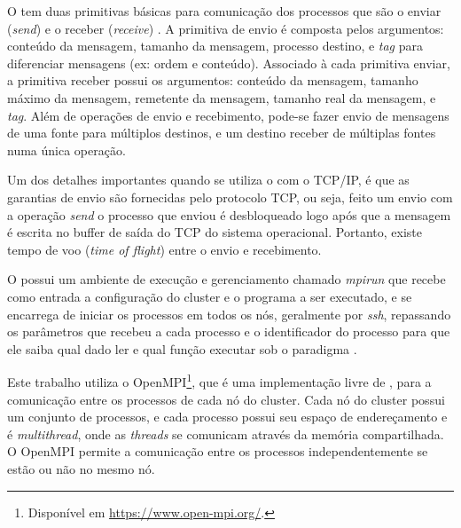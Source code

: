 O \mpi tem duas primitivas básicas para comunicação dos processos que são o
enviar (\emph{send}) e o receber (\emph{receive}) \cite{mpi-book}. A primitiva de
envio é composta pelos argumentos: conteúdo da mensagem, tamanho da mensagem,
processo destino, e \emph{tag} para diferenciar mensagens (ex: ordem e conteúdo).
Associado à cada primitiva enviar, a primitiva receber possui os argumentos:
conteúdo da mensagem, tamanho máximo da mensagem, remetente da mensagem, tamanho
real da mensagem, e \emph{tag}.
Além de operações de envio e recebimento, pode-se fazer
envio de mensagens de uma fonte para múltiplos destinos, e um destino receber de
múltiplas fontes numa única operação.

Um dos detalhes importantes quando se utiliza o \mpi com o TCP/IP, é que as
garantias de envio são fornecidas pelo protocolo TCP, ou seja, feito um envio
com a operação \emph{send} o processo que enviou é desbloqueado logo após que a
mensagem é escrita no buffer de saída do TCP do sistema operacional. Portanto,
existe tempo de voo (\emph{time of flight}) entre o envio e recebimento.

O \mpi possui um ambiente de execução e gerenciamento chamado \emph{mpirun} que
recebe como entrada a configuração do cluster e o programa a ser executado, e se
encarrega de iniciar os processos em todos os nós, geralmente por \emph{ssh},
repassando os parâmetros que recebeu a cada processo e o identificador do
processo para que ele saiba qual dado ler e qual função executar sob o paradigma
\spmd.

Este trabalho utiliza o OpenMPI\footnote{Disponível em \url{https://www.open-mpi.org/}.}, que é uma implementação livre de \mpi, para a
comunicação entre os processos de cada nó do cluster.
Cada nó do cluster possui um conjunto de processos, e cada processo possui seu
espaço de endereçamento e é \emph{multithread}, onde as \emph{threads} se comunicam
através da memória compartilhada.
O OpenMPI permite a comunicação entre os processos independentemente se estão ou não
no mesmo nó.


